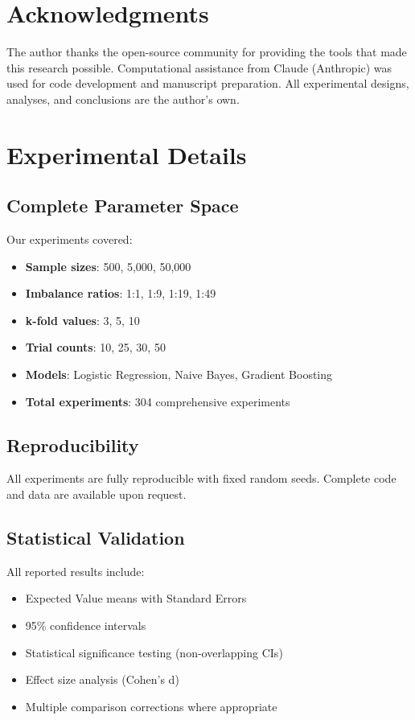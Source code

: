 \documentclass[11pt,twocolumn]{article}
\begin{document}
\section*{Acknowledgments}

The author thanks the open-source community for providing the tools that made this research possible. Computational assistance from Claude (Anthropic) was used for code development and manuscript preparation. All experimental designs, analyses, and conclusions are the author's own.




\appendix

\section{Experimental Details}

\subsection{Complete Parameter Space}
Our experiments covered:
\begin{itemize}
    \item \textbf{Sample sizes}: 500, 5,000, 50,000
    \item \textbf{Imbalance ratios}: 1:1, 1:9, 1:19, 1:49
    \item \textbf{k-fold values}: 3, 5, 10
    \item \textbf{Trial counts}: 10, 25, 30, 50
    \item \textbf{Models}: Logistic Regression, Naive Bayes, Gradient Boosting
    \item \textbf{Total experiments}: 304 comprehensive experiments
\end{itemize}

\subsection{Reproducibility}
All experiments are fully reproducible with fixed random seeds. Complete code and data are available upon request.

\subsection{Statistical Validation}
All reported results include:
\begin{itemize}
    \item Expected Value means with Standard Errors
    \item 95\% confidence intervals
    \item Statistical significance testing (non-overlapping CIs)
    \item Effect size analysis (Cohen's d)
    \item Multiple comparison corrections where appropriate
\end{itemize}
\end{document}
